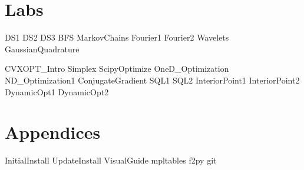 \documentclass[nociteref]{SIAM-GH-book}
\begin{document}
\part{Labs} %
{DS1}
{DS2}
{DS3}
{BFS}
{MarkovChains}
{Fourier1}
{Fourier2}
{Wavelets}
{GaussianQuadrature}

{CVXOPT_Intro}
{Simplex}
{ScipyOptimize}
{OneD_Optimization}
{ND_Optimization1}
{ConjugateGradient} %
{SQL1}
{SQL2}
{InteriorPoint1}
{InteriorPoint2}
{DynamicOpt1}
{DynamicOpt2}

\part{Appendices} %
\begin{appendices}
{InitialInstall}
{UpdateInstall}
{VisualGuide}
{mpltables}
{f2py}
{git}
\end{appendices}
\end{document}
